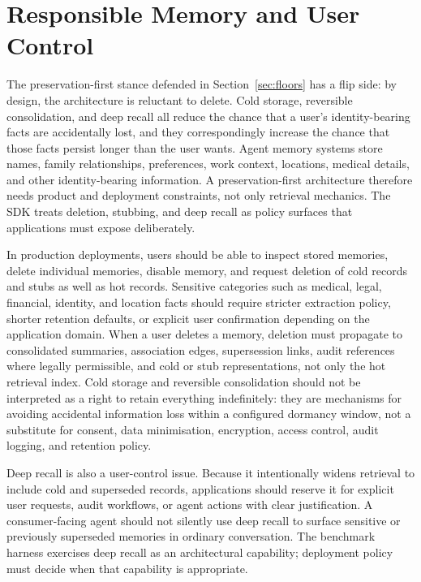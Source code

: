 \documentclass[11pt,a4paper]{article}
\begin{document}
\section{Responsible Memory and User Control}
\label{sec:responsible-memory}

The preservation-first stance defended in Section~\ref{sec:floors} has a flip side: by design, the architecture is reluctant to delete. Cold storage, reversible consolidation, and deep recall all reduce the chance that a user's identity-bearing facts are accidentally lost, and they correspondingly increase the chance that those facts persist longer than the user wants. Agent memory systems store names, family relationships, preferences, work context, locations, medical details, and other identity-bearing information. A preservation-first architecture therefore needs product and deployment constraints, not only retrieval mechanics. The SDK treats deletion, stubbing, and deep recall as policy surfaces that applications must expose deliberately.

In production deployments, users should be able to inspect stored memories, delete individual memories, disable memory, and request deletion of cold records and stubs as well as hot records. Sensitive categories such as medical, legal, financial, identity, and location facts should require stricter extraction policy, shorter retention defaults, or explicit user confirmation depending on the application domain. When a user deletes a memory, deletion must propagate to consolidated summaries, association edges, supersession links, audit references where legally permissible, and cold or stub representations, not only the hot retrieval index. Cold storage and reversible consolidation should not be interpreted as a right to retain everything indefinitely: they are mechanisms for avoiding accidental information loss within a configured dormancy window, not a substitute for consent, data minimisation, encryption, access control, audit logging, and retention policy.

Deep recall is also a user-control issue. Because it intentionally widens retrieval to include cold and superseded records, applications should reserve it for explicit user requests, audit workflows, or agent actions with clear justification. A consumer-facing agent should not silently use deep recall to surface sensitive or previously superseded memories in ordinary conversation. The benchmark harness exercises deep recall as an architectural capability; deployment policy must decide when that capability is appropriate.
\end{document}
